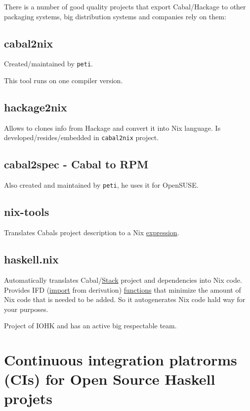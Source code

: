 \documentclass[a4paper,14pt,oneside]{book}
\begin{document}
There is a number of good quality projects that export Cabal/Hackage to other packaging systems, big distribution systems and companies rely on them:

\section{cabal2nix}
\label{sec:org71e66f2}

Created/maintained by \texttt{peti}.

This tool runs on one compiler version.

\section{hackage2nix}
\label{sec:org3fda572}

Allows to clones info from Hackage and convert it into Nix language.
Is developed/resides/embedded in \texttt{cabal2nix} project.

\section{cabal2spec - Cabal to RPM}
\label{sec:org19f0c79}

Also created and maintained by \texttt{peti}, he uses it for OpenSUSE.

\section{nix-tools}
\label{sec:org25a8d4b}

Translates Cabals project description to a Nix \hyperref[org755d8b0]{expression}.

\section{haskell.nix}
\label{sec:org1aaad35}

Automatically translates Cabal/\hyperref[org8132915]{Stack} project and dependencies into Nix code. Provides IFD (\hyperref[org1f16aa1]{import} from derivation) \hyperref[org196c7cc]{functions} that minimize the amount of Nix code that is needed to be added.
So it autogenerates Nix code hald way for your purposes.

Project of IOHK and has an active big respectable team.

\chapter{Continuous integration platrorms (CIs) for Open Source Haskell projets}
\label{sec:orgba283cc}
\end{document}
